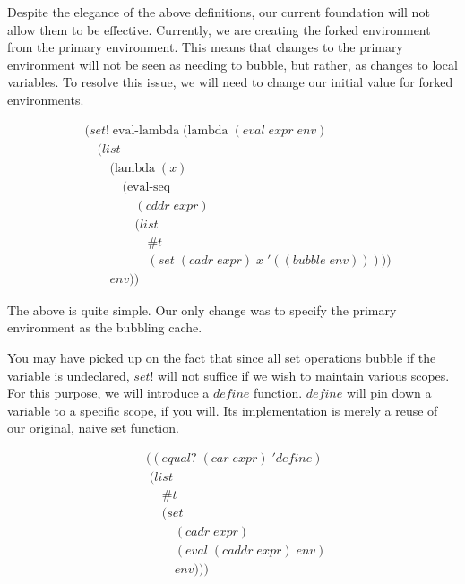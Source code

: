 Despite the elegance of the above definitions, our current foundation will
not allow them to be effective. Currently, we are creating the forked
environment from the primary environment. This means that changes to the
primary environment will not be seen as needing to bubble, but rather, as 
changes to local variables. To resolve this issue, we will need to change our
initial value for forked environments.

\begin{figure}[ht]
\caption{}\label{scheme}
\begin{align*}
& (set! \; \text{eval-lambda} \; (\text{lambda} \; (eval \; expr \; env)
\\& \quad (list
\\& \qquad (\text{lambda} \; (x) \; 
\\& \qquad \quad (\text{eval-seq} \; 
\\& \qquad \qquad (cddr \; expr) \; 
\\& \qquad \qquad (list
\\& \qquad \qquad \quad \#t
\\& \qquad \qquad \quad (set \; (cadr \; expr) \; x \; '((bubble \; env)))))
\\& \qquad env))
\end{align*}
\end{figure}

The above is quite simple. Our only change was to specify the primary
environment as the bubbling cache.

You may have picked up on the fact that since all set operations bubble if
the variable is undeclared, $set!$ will not suffice if we wish to maintain
various scopes. For this purpose, we will introduce a $define$ function.
$define$ will pin down a variable to a specific scope, if you will. Its
implementation is merely a reuse of our original, naive set function.

\begin{figure}[ht]
\caption{}\label{scheme}
\begin{align*}
& ((equal? \; (car \; expr) \; 'define)
\\& \; (list \; 
\\& \quad \; \#t \; 
\\& \quad \; (set \; 
\\& \qquad \; (cadr \; expr) \; 
\\& \qquad \; (eval \; (caddr \; expr) \; env) \; 
\\& \qquad \; env)))
\end{align*}
\end{figure}

